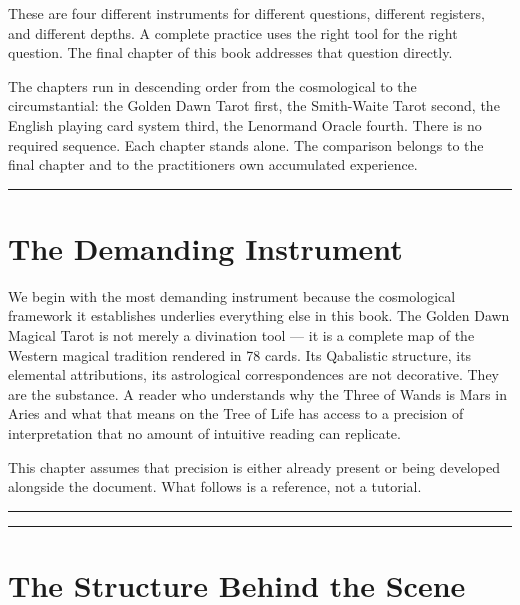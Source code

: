 These are four different instruments for different questions, different registers, and different depths. A complete practice uses the right tool for the right question. The final chapter of this book addresses that question directly.

The chapters run in descending order from the cosmological to the circumstantial: the Golden Dawn Tarot first, the Smith-Waite Tarot second, the English playing card system third, the Lenormand Oracle fourth. There is no required sequence. Each chapter stands alone. The comparison belongs to the final chapter and to the practitioner\textquotesingle s own accumulated experience.

\begin{center}\rule{0.5\linewidth}{0.5pt}\end{center}

\section{The Demanding Instrument}\label{before-chapter-one-the-golden-dawn-magical-tarot}

We begin with the most demanding instrument because the cosmological framework it establishes underlies everything else in this book. The Golden Dawn Magical Tarot is not merely a divination tool --- it is a complete map of the Western magical tradition rendered in 78 cards. Its Qabalistic structure, its elemental attributions, its astrological correspondences are not decorative. They are the substance. A reader who understands why the Three of Wands is Mars in Aries and what that means on the Tree of Life has access to a precision of interpretation that no amount of intuitive reading can replicate.

This chapter assumes that precision is either already present or being developed alongside the document. What follows is a reference, not a tutorial.

\begin{center}\rule{0.5\linewidth}{0.5pt}\end{center}

\begin{center}\rule{0.5\linewidth}{0.5pt}\end{center}

\section{The Structure Behind the Scene}\label{between-chapters-one-and-two}

